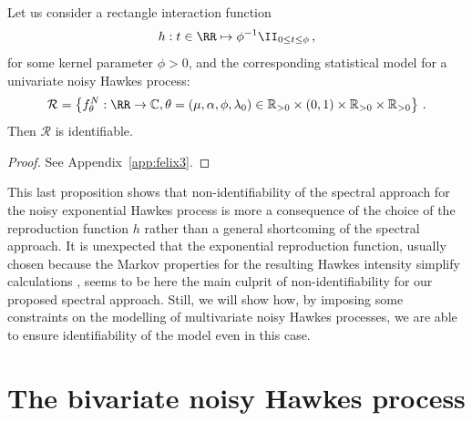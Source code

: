 \begin{proposition}\label{prop:chap3_rectangle}
  Let us consider a rectangle interaction function
  \[
    h : t \in \RR \mapsto \phi^{-1} \II_{0 \le t \le \phi}\,,
  \]
  for some kernel parameter $\phi > 0$,
  and the corresponding statistical model for a univariate noisy Hawkes process:
	\begin{equation*}
		\mathcal R = \left \{ f_\theta^N: \RR \to \mathbb C, \theta = (\mu, \alpha, \phi, \lambda_0) \in \mathbb R_{>0} \times (0, 1) \times \mathbb R_{>0} \times \mathbb R_{>0} \right\} \,.
	\end{equation*}
	Then $\mathcal R$ is identifiable.
\end{proposition}
\begin{proof}
  See Appendix~\ref{app:felix3}.
\end{proof}


This last proposition shows that non-identifiability of the spectral approach for the noisy exponential Hawkes process is more a consequence of the choice of the reproduction function $h$ rather than a general shortcoming of the spectral approach.
It is unexpected that the exponential reproduction function, usually chosen because the Markov properties for the resulting Hawkes intensity simplify calculations \parencite{Ozaki1979, DaFonseca2013, Duarte2019}, seems to be here the main culprit of non-identifiability for our proposed spectral approach. 
Still, we will show how, by imposing some constraints on the modelling of multivariate noisy Hawkes processes, we are able to ensure identifiability of the model even in this case.



    \section{The bivariate noisy Hawkes process}\label{sec:chap3_dim2}
    
